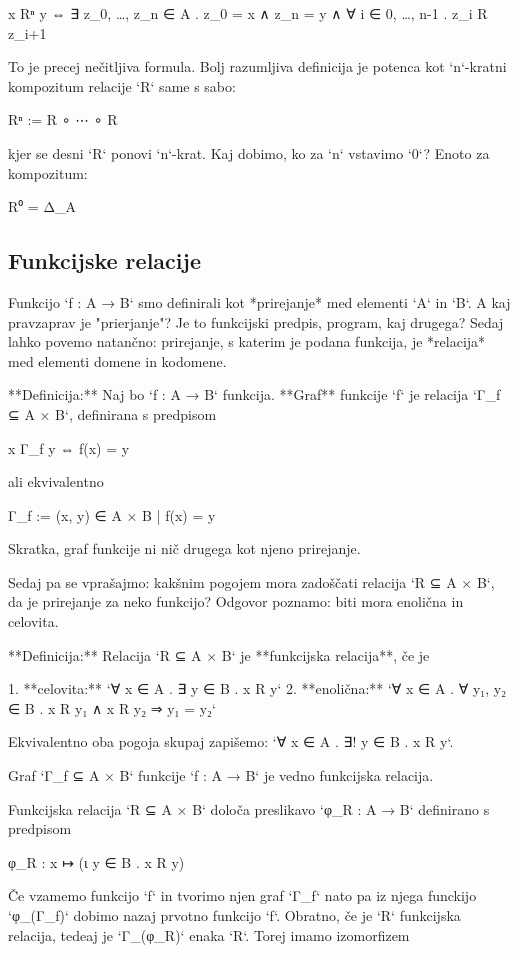     x Rⁿ y ⇔ ∃ z_0, …, z_n ∈ A . z_0 = x ∧ z_n = y ∧ ∀ i ∈ {0, …, n-1} . z_i R z_{i+1}

To je precej nečitljiva formula. Bolj razumljiva definicija je potenca kot `n`-kratni kompozitum relacije `R` same s
sabo:

    Rⁿ := R ∘ ⋯ ∘ R

kjer se desni `R` ponovi `n`-krat. Kaj dobimo, ko za `n` vstavimo `0`? Enoto za kompozitum:

    R⁰ = Δ_A


\subsection{Funkcijske relacije}

Funkcijo `f : A → B` smo definirali kot *prirejanje* med elementi `A` in `B`. A
kaj pravzaprav je "prierjanje"? Je to funkcijski predpis, program, kaj drugega?
Sedaj lahko povemo natančno: prirejanje, s katerim je podana funkcija, je
*relacija* med elementi domene in kodomene.

**Definicija:** Naj bo `f : A → B` funkcija. **Graf** funkcije `f` je relacija
`Γ_f ⊆ A × B`, definirana s predpisom

    x Γ_f y ⇔ f(x) = y

ali ekvivalentno

    Γ_f := { (x, y) ∈ A × B | f(x) = y }

Skratka, graf funkcije ni nič drugega kot njeno prirejanje.

Sedaj pa se vprašajmo: kakšnim pogojem mora zadoščati relacija `R ⊆ A × B`, da
je prirejanje za neko funkcijo? Odgovor poznamo: biti mora enolična in celovita.

**Definicija:** Relacija `R ⊆ A × B` je **funkcijska relacija**, če je

1. **celovita:** `∀ x ∈ A . ∃ y ∈ B . x R y`
2. **enolična:** `∀ x ∈ A . ∀ y₁, y₂ ∈ B . x R y₁ ∧ x R y₂ ⇒ y₁ = y₂`

Ekvivalentno oba pogoja skupaj zapišemo: `∀ x ∈ A . ∃! y ∈ B . x R y`.

Graf `Γ_f ⊆ A × B` funkcije `f : A → B` je vedno funkcijska relacija.

Funkcijska relacija `R ⊆ A × B` določa preslikavo `φ_R : A → B` definirano s predpisom

    φ_R : x ↦ (ι y ∈ B . x R y)

Če vzamemo funkcijo `f` in tvorimo njen graf `Γ_f` nato pa iz njega funckijo
`φ_(Γ_f)` dobimo nazaj prvotno funkcijo `f`. Obratno, če je `R` funkcijska
relacija, tedeaj je `Γ_(φ_R)` enaka `R`. Torej imamo izomorfizem

